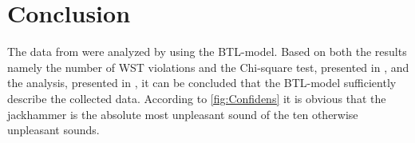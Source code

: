 \section*{Conclusion}
\label{Conclusion}
%
The data from \textcite{Ellermeier2004} were analyzed by using the BTL-model. Based on both the results namely the number of WST violations and the Chi-square test, presented in , and the analysis, presented in , it can be concluded that the BTL-model sufficiently describe the collected data. According to \autoref{fig:Confidens} it is obvious that the jackhammer is the absolute most unpleasant sound of the ten otherwise unpleasant sounds.   

